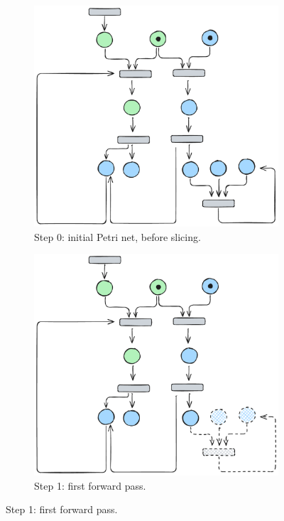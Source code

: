 \begin{figure}[H]
	\centering
	
	\begin{subfigure}[b]{0.45\textwidth}
		\centering
		\includegraphics[width=\textwidth]{plots/bidirectional_pruning_step_a_updated.pdf}
		\caption{Step 0: initial Petri net, before slicing.}
		\label{fig:step:a}
	\end{subfigure}\hfill
	\begin{subfigure}[b]{0.45\textwidth}
		\centering
		\includegraphics[width=\textwidth]{plots/bidirectional_pruning_step_b_updated.pdf}
		\caption{Step 1: first forward pass.}
		\label{fig:step:b}
	\end{subfigure}
	

\end{figure}
